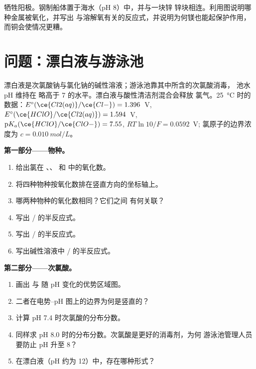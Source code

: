 \begin{exercise}[$\star\star\star$]\label{exo:b1:e-ph-diagrams:12}
牺牲阳极。钢制船体置于海水（pH 8）中，并与一块锌
锌块相连。利用图说明哪种金属被氧化，并写出
与溶解氧有关的反应式，并说明为何镁也能起保护作用，
而铜会使情况更糟。
\end{exercise}

\section{问题：漂白液与游泳池}

\begin{problem}
\label{pb:b1:e-ph-diagrams:1}
漂白液是次氯酸钠与氯化钠的碱性溶液；游泳池靠其中所含的次氯酸消毒，
池水 pH 维持在
略高于 7 的水平。漂白液与酸性清洁剂混合会释放
氯气。\qty{25}{\celsius} 时的数据：$E^\circ(\ce{Cl2(aq)}/\ce{Cl-})
= 1.396$~V, $E^\circ(\ce{HClO}/\ce{Cl2(aq)}) = 1.594$~V,
$\mathrm{p}K_a(\ce{HClO}/\ce{ClO-}) = 7.55$, $RT\ln 10/F = 0.0592$~V;
氯原子的边界浓度为 $c = \qty{0.010}{mol/L}$。

\medskip
\noindent\textbf{第一部分——物种。}
\begin{enumerate}
  \item 给出氯在 、、
         和  中的氧化数。
  \item 将四种物种按氧化数排在竖直方向的坐标轴上。
  \item 哪两种物种的氧化数相同？它们之间
        有何关联？
  \item 写出 / 的半反应式。
  \item 写出 / 的半反应式。
  \item 写出碱性溶液中 / 的半反应式。
\end{enumerate}

\medskip
\noindent\textbf{第二部分——次氯酸。}
\begin{enumerate}[resume]
  \item 画出  与  随
        pH 变化的优势区域图。
  \item 二者在电势--pH 图上的边界为何是竖直的？
  \item 计算 pH 7.4 时次氯酸的分布分数。
  \item 同样求 pH 8.0 时的分布分数。次氯酸是更好的消毒剂，为何
        游泳池管理人员要防止 pH 升至 8？
  \item 在漂白液（pH 约为 12）中，存在哪种形式？
\end{enumerate}


\end{problem}
